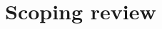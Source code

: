 \documentclass[mlabstract,twocolumn]{jmlr}
\begin{document}


\section{Scoping review}
\end{document}
